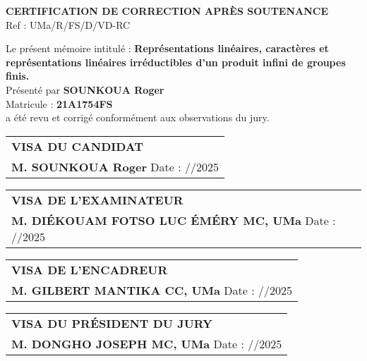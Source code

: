 \documentclass[11pt,a4paper]{article}
\begin{document}
\begin{center}
\vspace{1cm}
\Large\textbf{CERTIFICATION DE CORRECTION APRÈS SOUTENANCE} \\
\vspace{0.5cm}
Ref : \underline{\hspace{3cm}} UMa/R/FS/D/VD-RC \\
\end{center}

\vspace{0.75cm}
\noindent
Le présent mémoire intitulé : \small{\textbf{Représentations linéaires, caractères et représentations linéaires irréductibles d'un produit infini de groupes finis.}} \\
Présenté par \textbf{SOUNKOUA Roger} \\
Matricule : \textbf{21A1754FS} \\
a été revu et corrigé conformément aux observations du jury. \\

\vspace{1.5cm}

\begin{tabular}{@{}l@{}}
\textbf{VISA DU CANDIDAT} \\
\textbf{M. SOUNKOUA Roger}\hspace{5.25cm} Date : \underline{\hspace{1.5cm}}/\underline{\hspace{1.5cm}}/2025\\

\end{tabular}

\vspace{2.5cm}

\begin{tabular}{@{}l@{}}
\textbf{VISA DE L'EXAMINATEUR} \\
\textbf{M. DIÉKOUAM FOTSO LUC ÉMÉRY MC, UMa}  \hspace{2.5cm} Date : \underline{\hspace{1.5cm}}/\underline{\hspace{1.5cm}}/2025  \\

\end{tabular}

\vspace{2.5cm}

\begin{tabular}{@{}l@{}}
\textbf{VISA DE L'ENCADREUR} \\
\textbf{M. GILBERT MANTIKA CC, UMa} \hspace{5.3cm} Date : \underline{\hspace{1.5cm}}/\underline{\hspace{1.5cm}}/2025\\

\end{tabular}

\vspace{2.5cm}

\begin{tabular}{@{}l@{}}
\textbf{VISA DU PRÉSIDENT DU JURY} \\
\textbf{M. DONGHO JOSEPH MC, UMa} \hspace{2.5cm} Date : \underline{\hspace{1.5cm}}/\underline{\hspace{1.5cm}}/2025\\

\end{tabular}
\end{document}
